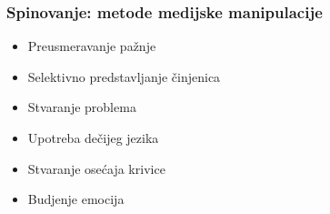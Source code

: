 \documentclass[13pt]{beamer}
\begin{document}
\begin{frame}[fragile]\frametitle{Spinovanje: metode medijske manipulacije}
	\begin{itemize}	
		\item Preusmeravanje pažnje
		\item Selektivno predstavljanje činjenica
		\item Stvaranje problema
  	\item Upotreba dečijeg jezika
		\item Stvaranje osećaja krivice
		\item Budjenje emocija
	\end{itemize}
\end{frame}
\end{document}
